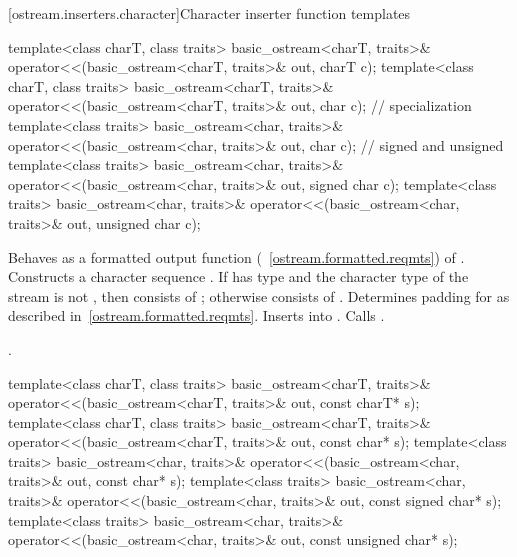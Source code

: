 [ostream.inserters.character]{Character inserter function templates}

%
\begin{itemdecl}
template<class charT, class traits>
  basic_ostream<charT, traits>& operator<<(basic_ostream<charT, traits>& out,
                                           charT c);
template<class charT, class traits>
  basic_ostream<charT, traits>& operator<<(basic_ostream<charT, traits>& out,
                                           char c);
  // specialization
template<class traits>
  basic_ostream<char, traits>& operator<<(basic_ostream<char, traits>& out,
                                          char c);
  // signed and unsigned
template<class traits>
  basic_ostream<char, traits>& operator<<(basic_ostream<char, traits>& out,
                                          signed char c);
template<class traits>
  basic_ostream<char, traits>& operator<<(basic_ostream<char, traits>& out,
                                          unsigned char c);
\end{itemdecl}

\begin{itemdescr}
\pnum
\effects
Behaves as a formatted output function
(~\ref{ostream.formatted.reqmts}) of . 
Constructs a character sequence . 
If  has type
and the character type of the stream is not
,
then  consists of
;
otherwise  consists of
. Determines padding for  as described
in~\ref{ostream.formatted.reqmts}. Inserts  into
. Calls .

\pnum
\returns
{}.
\end{itemdescr}

%
\begin{itemdecl}
template<class charT, class traits>
  basic_ostream<charT, traits>& operator<<(basic_ostream<charT, traits>& out,
                                           const charT* s);
template<class charT, class traits>
  basic_ostream<charT, traits>& operator<<(basic_ostream<charT, traits>& out,
                                           const char* s);
template<class traits>
  basic_ostream<char, traits>& operator<<(basic_ostream<char, traits>& out,
                                          const char* s);
template<class traits>
  basic_ostream<char, traits>& operator<<(basic_ostream<char, traits>& out,
                                          const signed char* s);
template<class traits>
  basic_ostream<char, traits>& operator<<(basic_ostream<char, traits>& out,
                                          const unsigned char* s);
\end{itemdecl}

